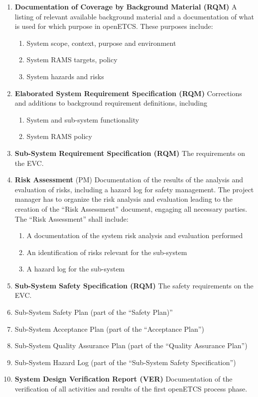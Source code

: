 \documentclass{template/openetcs_article}
\begin{document}
\begin{enumerate}
\item \textbf{Documentation of Coverage by Background Material (RQM)}
  A listing of relevant available background material and a
  documentation of what is used for which purpose in openETCS. These
  purposes include:
  \begin{enumerate}
  \item  System scope, context, purpose and environment
  \item System RAMS targets, policy
  \item System hazards and risks
  \end{enumerate}
\item \textbf{Elaborated System Requirement Specification (RQM)}  Corrections and additions to
  background requirement definitions, including
  \begin{enumerate}
  \item System and sub-system functionality
  \item System RAMS policy
  \end{enumerate}
\item \textbf{Sub-System Requirement Specification (RQM)}  The
  requirements on the EVC.
\item \textbf{Risk Assessment} (PM)  Documentation of the results of the
  analysis and evaluation of risks, including a hazard log for safety
  management. The project manager has to organize the risk analysis
  and evaluation leading to the creation of the ``Risk Assessment''
  document, engaging all necessary parties. The ``Risk Assessment''
  shall include:
  \begin{enumerate}
  \item A documentation of the system risk analysis and evaluation performed
  \item An identification of risks relevant for the sub-system
  \item A hazard log for the sub-system
  \end{enumerate}
\item \textbf{Sub-System Safety Specification (RQM)} The safety
  requirements on the EVC.
\item Sub-System Safety Plan (part of the ``Safety Plan)''
\item Sub-System Acceptance Plan (part of the ``Acceptance Plan'')
\item Sub-System Quality Assurance Plan (part of the ``Quality Assurance Plan'')
\item Sub-System Hazard Log (part of the ``Sub-System Safety Specification'')
\item \textbf{System Design Verification Report (VER)}  Documentation of the verification
  of all activities and results of the first openETCS process
  phase. 
\end{enumerate}
\end{document}
